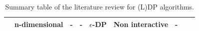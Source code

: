 \begin{landscape}
\begin{table}[ht]
\begin{tabular}{rllllllll}
      \citep{geng_optimal_2013}      & n-dimensional                  & -       & -                                                          & $\epsilon$-DP & Non interactive & -                        \\
      \bottomrule
    \end{tabular}
    \caption{Summary table of the literature review for (L)DP algorithms.}
    \label{tab:summary_table_dp}
  \end{table}

  \begin{table}
    \centering


\end{table}
\end{landscape}
